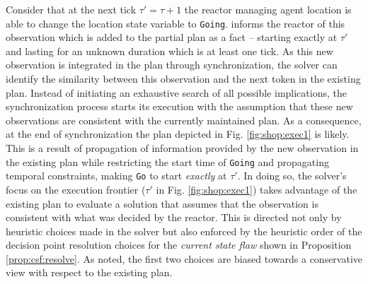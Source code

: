 Consider that at the next tick $\tau' = \tau+1$ the reactor managing
agent location is able to change the location state variable to
\texttt{Going}. \rx informs the reactor of this observation which is
added to the partial plan as a fact -- starting exactly at $\tau'$ and
lasting for an unknown duration which is at least one tick. As this
new observation is integrated in the plan through synchronization, the
solver can identify the similarity between this observation and the
next token in the existing plan. Instead of initiating an exhaustive
search of all possible implications, the synchronization process
starts its execution with the assumption that these new observations
are consistent with the currently maintained plan. As a consequence,
at the end of synchronization the plan depicted in Fig.
\ref{fig:shop:exec1} is likely. This is a result of propagation of
information provided by the new observation in the existing plan while
restricting the start time of \texttt{Going} and propagating temporal
constraints, making \texttt{Go} to start {\em exactly} at $\tau'$. In
doing so, the \eu solver's focus on the execution frontier ($\tau'$ in
Fig. \ref{fig:shop:exec1}) takes advantage of the existing plan to
evaluate a solution that assumes that the observation is consistent
with what was decided by the reactor.  This is
directed not only by heuristic choices made in the solver but also
enforced by the heuristic order of the decision point resolution
choices for the {\em current state flaw}  shown in
Proposition \ref{prop:csf:resolve}. As noted, the first two choices
are biased towards a conservative view with respect to the existing
plan.

\label{sec:arch:partialfailures}

